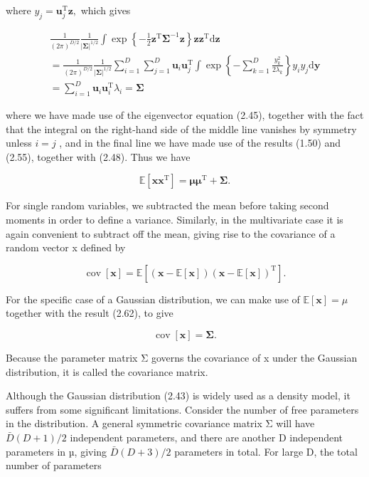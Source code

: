 \documentclass[
  10
]{article}
\begin{document}
where
\(y _ { j } = \mathbf { u } _ { j } ^ { \mathrm { T } } \mathbf { z } ,\)
which gives

\[
\begin{array}{l} \frac {1}{(2 \pi) ^ {D / 2}} \frac {1}{| \boldsymbol {\Sigma} | ^ {1 / 2}} \int \exp \left\{- \frac {1}{2} \mathbf {z} ^ {\mathrm{T}} \boldsymbol {\Sigma} ^ {- 1} \mathbf {z} \right\} \mathbf {z} \mathbf {z} ^ {\mathrm{T}}   \mathrm{d} \mathbf {z} \\ = \frac {1}{(2 \pi) ^ {D / 2}} \frac {1}{| \boldsymbol {\Sigma} | ^ {1 / 2}} \sum_ {i = 1} ^ {D} \sum_ {j = 1} ^ {D} \mathbf {u} _ {i} \mathbf {u} _ {j} ^ {\mathrm{T}} \int \exp \left\{- \sum_ {k = 1} ^ {D} \frac {y _ {k} ^ {2}}{2 \lambda_ {k}} \right\} y _ {i} y _ {j}   \mathrm{d} \mathbf {y} \\ = \sum_ {i = 1} ^ {D} \mathbf {u} _ {i} \mathbf {u} _ {i} ^ {\mathrm{T}} \lambda_ {i} = \boldsymbol {\Sigma} \end{array}\tag{2.61}
\]

where we have made use of the eigenvector equation (2.45), together with
the fact that the integral on the right-hand side of the middle line
vanishes by symmetry unless \(i = j\) , and in the final line we have
made use of the results (1.50) and (2.55), together with (2.48). Thus we
have

\[
\mathbb {E} \left[ \mathbf {x x} ^ {\mathrm{T}} \right] = \boldsymbol {\mu} \boldsymbol {\mu} ^ {\mathrm{T}} + \boldsymbol {\Sigma}.\tag{2.62}
\]

For single random variables, we subtracted the mean before taking second
moments in order to define a variance. Similarly, in the multivariate
case it is again convenient to subtract off the mean, giving rise to the
covariance of a random vector x defined by

\[
\operatorname{cov} [ \mathbf {x} ] = \mathbb {E} \left[ (\mathbf {x} - \mathbb {E} [ \mathbf {x} ]) (\mathbf {x} - \mathbb {E} [ \mathbf {x} ]) ^ {\mathrm{T}} \right].\tag{2.63}
\]

For the specific case of a Gaussian distribution, we can make use of
\(\mathbb { E } [ \mathbf { x } ] = \mu\) together with the result
(2.62), to give

\[
\operatorname{cov} [ \mathbf {x} ] = \boldsymbol {\Sigma}.\tag{2.64}
\]

Because the parameter matrix Σ governs the covariance of x under the
Gaussian distribution, it is called the covariance matrix.

Although the Gaussian distribution (2.43) is widely used as a density
model, it suffers from some significant limitations. Consider the number
of free parameters in the distribution. A general symmetric covariance
matrix Σ will have \(\bar { D } ( D + 1 ) / 2\) independent parameters,
and there are another D independent parameters in µ, giving
\(\bar { D } ( D + 3 ) / 2\) parameters in total. For large D, the total
number of parameters
\end{document}
